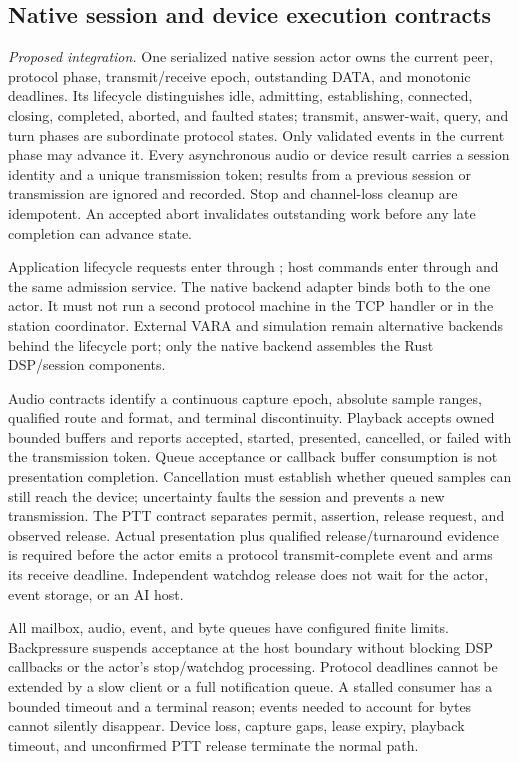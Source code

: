 \subsection{Native session and device execution contracts}
\label{sec:modem-execution-contracts}
\emph{Proposed integration.} One serialized native session actor owns the
current peer, protocol phase, transmit/receive epoch, outstanding DATA, and
monotonic deadlines. Its lifecycle distinguishes idle, admitting,
establishing, connected, closing, completed, aborted, and faulted states;
transmit, answer-wait, query, and turn phases are subordinate protocol states.
Only validated events in the current phase may advance it. Every asynchronous
audio or device result carries a session identity and a unique transmission
token; results from a previous session or transmission are ignored and
recorded. Stop and channel-loss cleanup are idempotent. An accepted abort
invalidates outstanding work before any late completion can advance state.

Application lifecycle requests enter through ; host
commands enter through  and the same admission service.
The native backend adapter binds both to the one actor. It must not run a
second protocol machine in the TCP handler or in the station coordinator.
External VARA and simulation remain alternative backends behind the lifecycle
port; only the native backend assembles the Rust DSP/session components.

Audio contracts identify a continuous capture epoch, absolute sample ranges,
qualified route and format, and terminal discontinuity. Playback accepts
owned bounded buffers and reports accepted, started, presented, cancelled,
or failed with the transmission token. Queue acceptance or callback buffer
consumption is not presentation completion. Cancellation must establish
whether queued samples can still reach the device; uncertainty faults the
session and prevents a new transmission. The PTT contract separates permit,
assertion, release request, and observed release. Actual presentation plus
qualified release/turnaround evidence is required before the actor emits a
protocol transmit-complete event and arms its receive deadline. Independent
watchdog release does not wait for the actor, event storage, or an AI host.

All mailbox, audio, event, and byte queues have configured finite limits.
Backpressure suspends acceptance at the host boundary without blocking DSP
callbacks or the actor's stop/watchdog processing. Protocol deadlines cannot
be extended by a slow client or a full notification queue. A stalled consumer
has a bounded timeout and a terminal reason; events needed to account for
bytes cannot silently disappear. Device loss, capture gaps, lease expiry,
playback timeout, and unconfirmed PTT release terminate the normal path.

